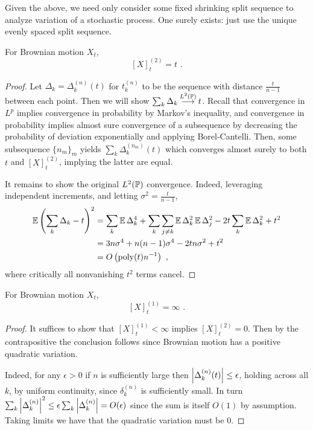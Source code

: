 \documentclass{article}
\begin{document}
       Given the above, we need only consider some fixed shrinking split sequence to analyze variation of a stochastic process. One surely exists: just use the unique evenly spaced split sequence.

         \begin{theorem}
           For Brownian motion \(X_t\),
           \[[X]_t^{(2)}=t\,\,.\]
         \end{theorem}
         \begin{proof}
           Let \(\Delta_k=\Delta_k^{(n)}(t)\) for \(t_k^{(n)}\) to be the sequence with distance \(\frac{t}{n-1}\) between each point. Then we will show \(\sum_k\Delta_k\mathbin{\overset{L^2\pa{\P}}{\longrightarrow}} t\). Recall that convergence in \(L^{p}\) implies convergence in probability by Markov's inequality, and convergence in probability implies almost sure convergence of a subsequence by decreasing the probability of deviation exponentially and applying Borel-Cantelli. Then, some subsequence \(\{n_m\}_m\) yields \(\sum_k\Delta^{(n_m)}_k(t)\) which converges almost surely to both \(t\) and \([X]_t^{(2)}\), implying the latter are equal.

           It remains to show the original \(L^2(\P)\) convergence. Indeed, leveraging independent increments, and letting \(\sigma^2=\frac{t}{n-1}\),
           \begin{align*}
             \E\pa{\sum_k\Delta_k-t}^2&=\sum_k\E\Delta_k^4+\sum_k\sum_{j\neq k}\E\Delta_k^2\E\Delta_j^2-2t\sum_k\E\Delta_k^2+t^2\\
                                      &=3n\sigma^4+n(n-1)\sigma^4-2tn\sigma^2+t^2\\
             &= O\pa{\mathrm{poly}(t)n^{-1}}\,\,,
           \end{align*}
           where critically all nonvanishing \(t^2\) terms cancel.
         \end{proof}

         \begin{theorem}
           For Brownian motion \(X_t\),
           \[[X]_t^{(1)}=\infty\,\,.\]
         \end{theorem}
         \begin{proof}
           It suffices to show that \([X]_t^{(1)}<\infty\) implies \([X]_t^{(2)}=0\). Then by the contrapositive the conclusion follows since Brownian motion has a positive quadratic variation.

           Indeed, for any \(\epsilon>0\) if \(n\) is sufficiently large then \(\abs{\Delta_k^{(n)}(t)}\le\epsilon\), holding across all \(k\), by uniform continuity, since \(\delta_k^{(n)}\) is sufficiently small. In turn \(\sum_k\abs{\Delta_k^{(n)}}^2\le\epsilon\sum_k\abs{\Delta_k^{(n)}}=O(\epsilon)\) since the sum is itself \(O(1)\) by assumption. Taking limits we have that the quadratic variation must be \(0\).           
\end{proof}
\end{document}
